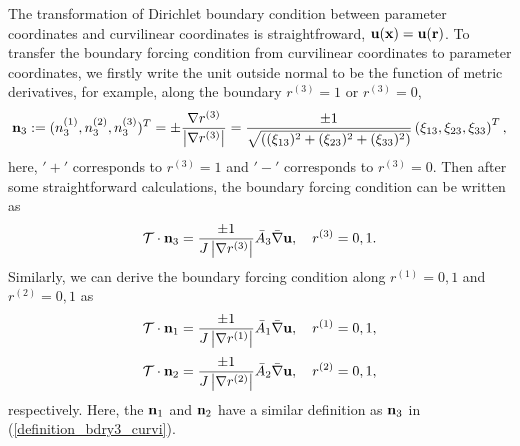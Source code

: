 \documentclass[a4paper]{article}
\begin{document}
The transformation of Dirichlet boundary condition between parameter coordinates and curvilinear coordinates is straightfroward, ${\bf u}({\bf x}) = {\bf u}(\bf r)$. To transfer the boundary forcing condition from curvilinear coordinates to parameter coordinates, we firstly write the unit outside normal to be the function of metric derivatives, for example, along the boundary $r^{(3)} = 1$ or $r^{(3)} = 0$,
\begin{equation}\label{definition_bdry3_curvi}
{\bf n}_3 := (n^{(1)}_3,n^{(2)}_3,n^{(3)}_3)^T = \pm \frac{\nabla r^{(3)}}{\left|\nabla r^{(3)}\right|} = \frac{\pm 1}{\sqrt{((\xi_{13})^2+(\xi_{23})^2+(\xi_{33})^2)}}\left(\xi_{13},\xi_{23},\xi_{33}\right)^T,
\end{equation}
here, $'+'$ corresponds to $r^{(3)} = 1$ and $'-'$ corresponds to $r^{(3)} = 0$. Then after some straightforward calculations, the boundary forcing condition can be written as
\begin{equation}\label{bdry3_curvi}
\mathcal{T}\cdot{\bf n}_3 = \frac{\pm 1}{J\left|\nabla r^{(3)}\right|}\bar{A}_3\bar{\nabla}{\bf u}, \ \ \ r^{(3)} = 0, 1.
\end{equation}
Similarly, we can derive the boundary forcing condition along $r^{(1)} = 0,1$ and $r^{(2)} = 0,1$ as
\begin{equation}\label{bdry1_curvi}
\mathcal{T}\cdot{\bf n}_1 = \frac{\pm 1}{J\left|\nabla r^{(1)}\right|}\bar{A}_1\bar{\nabla}{\bf u}, \ \ \ r^{(1)} = 0, 1,
\end{equation}
\begin{equation}\label{bdry2_curvi}
\mathcal{T}\cdot{\bf n}_2 = \frac{\pm 1}{J\left|\nabla r^{(2)}\right|}\bar{A}_2\bar{\nabla}{\bf u}, \ \ \ r^{(2)} = 0, 1,
\end{equation} 
respectively. Here, the ${\bf n}_1$ and ${\bf n}_2$ have a similar definition as ${\bf n}_3$ in (\ref{definition_bdry3_curvi}).
\end{document}
